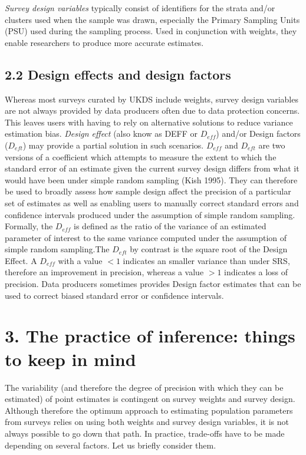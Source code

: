 \documentclass[
  14,
  a4paper,
  DIV=11,
  numbers=noendperiod]{scrartcl}
\begin{document}
\emph{Survey design variables} typically consist of identifiers for the
strata and/or clusters used when the sample was drawn, especially the
Primary Sampling Units (PSU) used during the sampling process. Used in
conjunction with weights, they enable researchers to produce more
accurate estimates.

\hypertarget{design-effects-and-design-factors}{%
\subsection{2.2 Design effects and design
factors}\label{design-effects-and-design-factors}}

Whereas most surveys curated by UKDS include weights, survey design
variables are not always provided by data producers often due to data
protection concerns. This leaves users with having to rely on
alternative solutions to reduce variance estimation bias. \emph{Design
effect} (also know as DEFF or \(D_{eff}\)) and/or Design factors
(\(D_{eft}\)) may provide a partial solution in such scenarios.
\(D_{eff}\) and \(D_{eft}\) are two versions of a coefficient which
attempts to measure the extent to which the standard error of an
estimate given the current survey design differs from what it would have
been under simple random sampling (Kish 1995). They can therefore be
used to broadly assess how sample design affect the precision of a
particular set of estimates as well as enabling users to manually
correct standard errors and confidence intervals produced under the
assumption of simple random sampling. Formally, the \(D_{eff}\) is
defined as the ratio of the variance of an estimated parameter of
interest to the same variance computed under the assumption of simple
random sampling.The \(D_{eft}\) by contrast is the square root of the
Design Effect. A \(D_{eff}\) with a value \(<1\) indicates an smaller
variance than under SRS, therefore an improvement in precision, whereas
a value \(>1\) indicates a loss of precision. Data producers sometimes
provides Design factor estimates that can be used to correct biased
standard error or confidence intervals.

\hypertarget{the-practice-of-inference-things-to-keep-in-mind}{%
\section{3. The practice of inference: things to keep in
mind}\label{the-practice-of-inference-things-to-keep-in-mind}}

The variability (and therefore the degree of precision with which they
can be estimated) of point estimates is contingent on survey weights and
survey design. Although therefore the optimum approach to estimating
population parameters from surveys relies on using both weights and
survey design variables, it is not always possible to go down that path.
In practice, trade-offs have to be made depending on several factors.
Let us briefly consider them.
\end{document}
